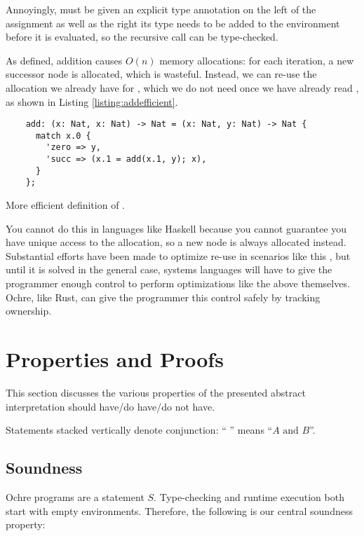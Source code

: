 \documentclass[12pt,twoside]{report}
\begin{document}
Annoyingly,  must be given an explicit type annotation on the left of the assignment as well as the right its type needs to be added to the environment before it is evaluated, so the recursive call can be type-checked.

As defined, addition causes $O(n)$ memory allocations: for each iteration, a new successor node is allocated, which is wasteful. Instead, we can re-use the allocation we already have for , which we do not need once we have already read , as shown in Listing \ref{listing:addefficient}.

\begin{listing}
  \begin{verbatim}
    add: (x: Nat, x: Nat) -> Nat = (x: Nat, y: Nat) -> Nat {
      match x.0 {
        'zero => y,
        'succ => (x.1 = add(x.1, y); x),
      }
    };
  \end{verbatim}
  \caption{More efficient definition of .}
  \label{listing:natadd}
\end{listing}

You cannot do this in languages like Haskell because you cannot guarantee you have unique access to the allocation, so a new node is always allocated instead. Substantial efforts have been made to optimize re-use in scenarios like this \citep{ningningPerceusGarbageFree2021}, but until it is solved in the general case, systems languages will have to give the programmer enough control to perform optimizations like the above themselves. Ochre, like Rust, can give the programmer this control safely by tracking ownership.


\section{Properties and Proofs}
\label{section:properties}

This section discusses the various properties of the presented abstract interpretation should have/do have/do not have.

Statements stacked vertically denote conjunction: ``
''
means ``$A \text{ and } B$''.

\subsection{Soundness}
Ochre programs are a statement $S$. Type-checking and runtime execution both start with empty environments. Therefore, the following is our central soundness property:
\end{document}
